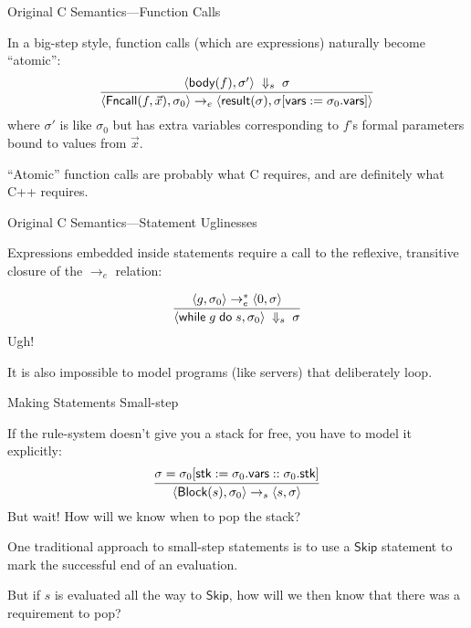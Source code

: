 \documentclass[compress,dvips,color=usenames,xcolor=dvipsnames]{beamer}
\newcommand{\cpp}{\mbox{C\hspace{-.1em}+\hspace{-.05em}+}}
\newcommand{\strong}[1]{{\structcol #1}}
\newcommand{\structcol}{\usebeamercolor[fg]{structure}}
\begin{document}
\begin{frame}{Original C Semantics---Function Calls}

  In a big-step style, function calls (which are expressions)
  naturally become ``atomic'':
  \[
  \infer{
    \langle \textsf{Fncall}(f,\vec{x}), \sigma_0 \rangle \rightarrow_e
    \langle \textsf{result}(\sigma),
    \sigma[\textsf{vars} := \sigma_0.\textsf{vars}]
    \rangle
  }{
    \langle \textsf{body}(f), \sigma'\rangle \;\Downarrow_s\; \sigma
  }
\]
where $\sigma'$ is like $\sigma_0$ but has extra variables
corresponding to $f$'s formal parameters bound to values from
$\vec{x}$.

\bigskip
``Atomic'' function calls are probably what C requires, and are
\strong{definitely} what \cpp{} requires.


\end{frame}

\begin{frame}{Original C Semantics---Statement Uglinesses}

  Expressions embedded inside statements require a call to the
  reflexive, transitive closure of the $\rightarrow_e$ relation:

\[
\infer{
  \langle\textsf{while}\;g \;\textsf{do}\;s,\sigma_0\rangle
  \;\Downarrow_s\;
  \sigma
}{
  \langle g, \sigma_0 \rangle \rightarrow_e^* \langle 0, \sigma\rangle
}
\]
Ugh!

\bigskip It is also impossible to model programs (like servers) that
deliberately loop.

\end{frame}

\begin{frame}{Making Statements Small-step}

If the rule-system doesn't give you a stack for free, you have to
model it explicitly:
\[
\infer{
  \langle \textsf{Block}(s), \sigma_0 \rangle \rightarrow_s
  \langle s, \sigma\rangle
}{
  \sigma =
  \sigma_0[\textsf{stk} := \sigma_0.\textsf{vars} :: \sigma_0.\textsf{stk}]
}
\]
But wait!  How will we know when to pop the stack?

\bigskip
One traditional approach to small-step statements is to use a
$\textsf{Skip}$ statement to mark the successful end of an
evaluation.

\bigskip But if $s$ is evaluated all the way to $\textsf{Skip}$,
how will we then know that there was a requirement to pop?

\end{frame}
\end{document}
